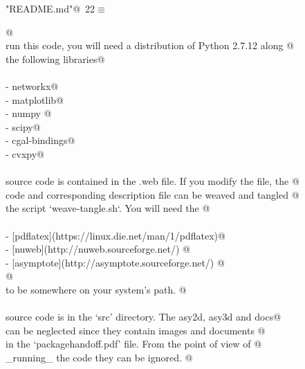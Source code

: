 \documentclass[10pt, english, oneside]{report}
\begin{document}
\begin{appendices}
\begin{flushleft} \small\label{scrap22}\raggedright\small
{} \verb@"README.md"@\nobreak\ {\footnotesize {22}}$\equiv$
\vspace{-1ex}
\begin{list}{}{} \item
\mbox{}\verb@    @\\
\mbox{}\verb@To run this code, you will need a distribution of Python 2.7.12 along @\\
\mbox{}\verb@with the following libraries@\\
\mbox{}\verb@@\\
\mbox{}\verb@- networkx@\\
\mbox{}\verb@- matplotlib@\\
\mbox{}\verb@- numpy @\\
\mbox{}\verb@- scipy@\\
\mbox{}\verb@- cgal-bindings@\\
\mbox{}\verb@- cvxpy@\\
\mbox{}\verb@@\\
\mbox{}\verb@All source code is contained in the .web file. If you modify the file, the @\\
\mbox{}\verb@resulting code and corresponding description file can be weaved and tangled @\\
\mbox{}\verb@with the script `weave-tangle.sh`. You will need the @\\
\mbox{}\verb@@\\
\mbox{}\verb@- [pdflatex](https://linux.die.net/man/1/pdflatex)@\\
\mbox{}\verb@- [nuweb](http://nuweb.sourceforge.net/) @\\
\mbox{}\verb@- [asymptote](http://asymptote.sourceforge.net/) @\\
\mbox{}\verb@  @\\
\mbox{}\verb@executables to be somewhere on your system's path. @\\
\mbox{}\verb@@\\
\mbox{}\verb@All source code is in the `src' directory. The asy2d, asy3d and docs@\\
\mbox{}\verb@folders can be neglected since they contain images and documents @\\
\mbox{}\verb@referenced in the `packagehandoff.pdf' file. From the point of view of @\\
\mbox{}\verb@_running_ the code they can be ignored. @\\
\mbox{}\verb@@\\
\mbox{}\verb@@\\
\mbox{}\verb@@\\
\mbox{}\verb@@{\NWsep}
\end{list}
\vspace{-1.5ex}
\footnotesize
\begin{list}{}{\setlength{\itemsep}{-\parsep}\setlength{\itemindent}{-\leftmargin}}


\end{list}
\end{flushleft}
\end{appendices}
\end{document}
